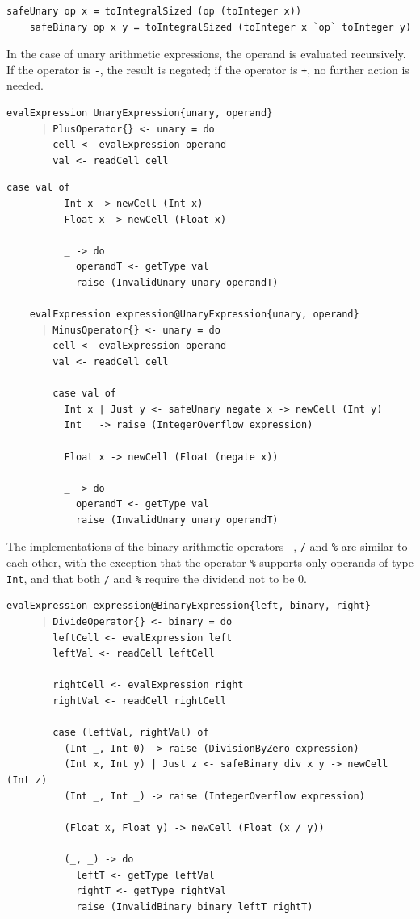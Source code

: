\documentclass[UdineBachThesis,american,11pt]{PhdThesis}
\begin{document}
  \begin{Verbatim}[gobble=4,fontsize=\small]
    safeUnary op x = toIntegralSized (op (toInteger x))
    safeBinary op x y = toIntegralSized (toInteger x `op` toInteger y)
  \end{Verbatim}

  In the case of unary arithmetic expressions, the operand is evaluated
  recursively. If the operator is \texttt{-}, the result is negated; if the
  operator is \texttt{+}, no further action is needed.

  \begin{Verbatim}[gobble=4,fontsize=\small]
    evalExpression UnaryExpression{unary, operand}
      | PlusOperator{} <- unary = do
        cell <- evalExpression operand
        val <- readCell cell
  \end{Verbatim}

  \pagebreak

  \begin{Verbatim}[gobble=4,fontsize=\small]
        case val of
          Int x -> newCell (Int x)
          Float x -> newCell (Float x)

          _ -> do
            operandT <- getType val
            raise (InvalidUnary unary operandT)

    evalExpression expression@UnaryExpression{unary, operand}
      | MinusOperator{} <- unary = do
        cell <- evalExpression operand
        val <- readCell cell

        case val of
          Int x | Just y <- safeUnary negate x -> newCell (Int y)
          Int _ -> raise (IntegerOverflow expression)

          Float x -> newCell (Float (negate x))

          _ -> do
            operandT <- getType val
            raise (InvalidUnary unary operandT)
  \end{Verbatim}

  The implementations of the binary arithmetic operators \texttt{-}, \texttt{/}
  and \texttt{\%} are similar to each other, with the exception that the
  operator \texttt{\%} supports only operands of type \mbox{\texttt{Int}}, and
  that both \texttt{/} and \texttt{\%} require the dividend not to be 0.

  \begin{Verbatim}[gobble=4,fontsize=\small]
    evalExpression expression@BinaryExpression{left, binary, right}
      | DivideOperator{} <- binary = do
        leftCell <- evalExpression left
        leftVal <- readCell leftCell

        rightCell <- evalExpression right
        rightVal <- readCell rightCell

        case (leftVal, rightVal) of
          (Int _, Int 0) -> raise (DivisionByZero expression)
          (Int x, Int y) | Just z <- safeBinary div x y -> newCell (Int z)
          (Int _, Int _) -> raise (IntegerOverflow expression)

          (Float x, Float y) -> newCell (Float (x / y))

          (_, _) -> do
            leftT <- getType leftVal
            rightT <- getType rightVal
            raise (InvalidBinary binary leftT rightT)
  \end{Verbatim}
\end{document}
